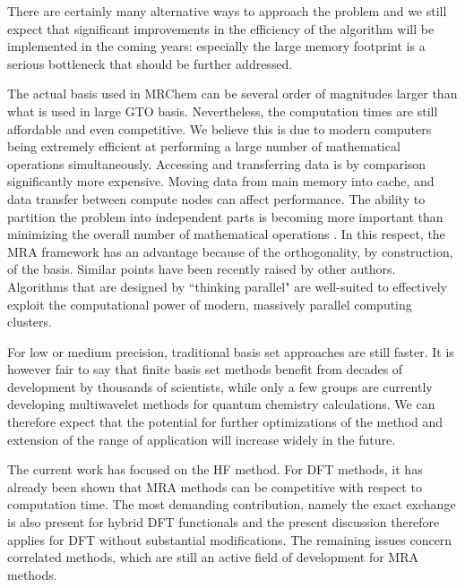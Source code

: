\documentclass[journal=jctcce, manuscript=article]{achemso}
\begin{document}
There are certainly many alternative ways to approach the problem and
we still expect that significant improvements in the efficiency of the
algorithm will be implemented in the coming years: especially the
large memory footprint is a serious bottleneck that should be further
addressed.

The actual basis used in MRChem can be
several order of magnitudes larger than what is used in large \ac{GTO}
basis. Nevertheless, the computation times are still affordable and even
competitive. We believe this is due to modern computers being
extremely efficient at performing a large number of
mathematical operations simultaneously. Accessing and transferring data is by comparison
significantly more expensive. Moving data from main memory into
cache, and data transfer between compute nodes can affect
performance. The ability to
partition the problem into independent parts is becoming more
important than minimizing the overall number of mathematical
operations \cite{Gavini}. In this respect, the \ac{MRA} framework has an advantage
because of the orthogonality, by construction, of the basis. Similar points have been recently raised by other authors.
\cite{Penchoff2021-cl, Ratcliff2017-nr}
Algorithms that are designed by ``thinking parallel" are well-suited to effectively exploit the computational power of 
modern, massively parallel computing clusters.\cite{Mattson2004-oc,McCool2012-tx}

For low or medium precision, traditional basis set
approaches are still faster.  It is however fair to say that finite
basis set methods benefit from decades of development by thousands of
scientists, while only a few groups are currently developing
multiwavelet methods for quantum chemistry calculations. We can
therefore expect that the potential for further optimizations of the
method and extension of the range of application will increase widely
in the future.

The current work has focused on the \ac{HF} method. For \ac{DFT}
methods, it has already been shown that
\ac{MRA} methods can be competitive with respect to computation
time.\cite{Bischoff2019-mr} The most demanding contribution, namely the exact exchange is
also present for hybrid \ac{DFT} functionals and the present
discussion therefore applies for \ac{DFT} without
substantial modifications. The remaining issues concern
correlated methods, which are still an active field of development for
\ac{MRA} methods.\cite{Bischoff2013, Kottmann2017, Kottmann2020}
\end{document}
